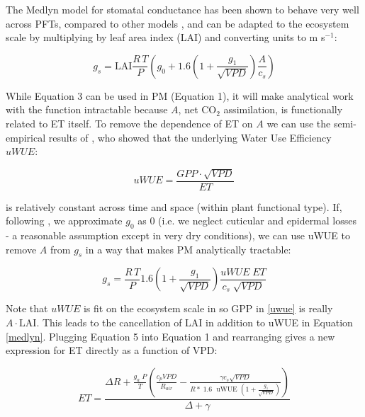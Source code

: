 \documentclass[draft,linenumbers]{agujournal}
\begin{document}
The Medlyn model for stomatal conductance has been shown to behave very well across PFTs, compared to other models \citep{Lin_2015}, and can be adapted to the ecosystem scale by multiplying by leaf area index (LAI) and converting units to m s$^{-1}$:

\begin{linenomath*}
  \label{medlyn}
  \begin{equation}
  g_s = \text{LAI} \frac{R \,T}{P} \left( g_0 + 1.6 \left(1 + \frac{g_1}{\sqrt{VPD}}\right) \frac{A}{c_s}\right)
  \end{equation}
\end{linenomath*}

While Equation 3 can be used in PM (Equation 1), it will make analytical work with the function intractable because $A$, net CO$_2$ assimilation, is functionally related to ET itself. To remove the dependence of ET on $A$ we can use the semi-empirical results of \citet{Zhou_2015}, who showed that the underlying Water Use Efficiency $uWUE$:

\begin{linenomath*}
  \begin{equation}
    \label{uwue}
uWUE = \frac{GPP \cdot \sqrt{VPD}}{ET}
  \end{equation}
\end{linenomath*}
is relatively constant across time and space (within plant functional type). If, following \citet{Lin_2015}, we approximate $g_0$ as $0$ (i.e. we neglect cuticular and epidermal losses - a reasonable assumption except in very dry conditions), we can use uWUE to remove $A$ from $g_s$ in a way that makes PM analytically tractable:

\begin{linenomath*}
  \begin{equation}
  g_s = \frac{R \, T}{P} 1.6 \left(1 + \frac{g_1}{\sqrt{VPD}}\right) \frac{uWUE \; ET}{c_s \; \sqrt{VPD}}
  \end{equation}
\end{linenomath*}

Note that $uWUE$ is fit on the ecosystem scale in \citet{Zhou_2015} so GPP in \ref{uwue} is really $A\cdot \text{LAI}$. This leads to the cancellation of LAI in addition to uWUE in Equation \ref{medlyn}. Plugging Equation 5 into Equation 1 and rearranging gives a new expression for ET directly as a function of VPD:

\begin{linenomath*}
  \begin{equation}
    ET = \frac{\Delta R + \frac{g_a\; P}{T} \left( \frac{ c_p VPD}{R_{air}} -  \frac{\gamma c_s \sqrt{VPD} }{ R* \; 1.6\; \text{ uWUE } (1 + \frac{g_1}{\sqrt{VPD}})} \right) }{ \Delta + \gamma}
    \label{et}
  \end{equation}
\end{linenomath*}
\end{document}

